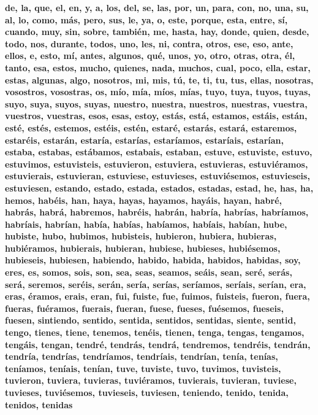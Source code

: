 \begin{displayquote}
\textbf{  de, la, que, el, en, y, a, los, del, se, las, por, un, para, con, no, una, su, al, lo, como, más, pero, sus, le, ya, o, este, porque, esta, entre, sí, cuando, muy, sin, sobre,
 también, me, hasta, hay, donde, quien, desde, todo, nos, durante, todos, uno, les, ni, contra, otros, ese, eso, ante, ellos, e, esto, mí, antes, algunos, qué, unos, yo, otro, otras, otra, él, tanto, esa, estos, mucho, quienes, nada, muchos, cual, poco, ella, estar, estas, algunas, algo, nosotros, mi, mis, tú, te, ti, tu, tus, ellas, nosotras, vosostros, vosostras, os, mío, mía, míos, mías, tuyo, tuya, tuyos, tuyas, suyo, suya, suyos, suyas, nuestro, nuestra, nuestros, nuestras, vuestra, vuestros, vuestras, esos, esas, estoy, estás, está, estamos, estáis, están, esté, estés, estemos, estéis, estén, estaré, estarás, estará, estaremos, estaréis, estarán, estaría, estarías, estaríamos, estaríais, estarían, estaba, estabas, 
 estábamos, estabais, estaban, estuve, estuviste, estuvo, estuvimos, estuvisteis, estuvieron, estuviera, estuvieras, estuviéramos, estuvierais, estuvieran, estuviese, estuvieses, 
 estuviésemos, estuvieseis, estuviesen, estando, estado, estada, estados, estadas, estad, he, has, ha, hemos, habéis, han, haya, hayas, hayamos, hayáis, hayan, habré, habrás, habrá, habremos, habréis, habrán, habría, habrías, habríamos, habríais, habrían, había, habías, habíamos, habíais, habían, 
 hube, hubiste, hubo, hubimos, hubisteis, hubieron, hubiera, hubieras, hubiéramos, hubierais, hubieran, hubiese,
 hubieses, hubiésemos, hubieseis, hubiesen, habiendo, habido, habida, habidos, habidas, soy, eres, es, somos, sois, son, sea, 
 seas, seamos, seáis, sean, seré, serás, será, seremos, 
 seréis, serán, sería, serías, seríamos, seríais, serían, era, 
 eras, éramos, erais, eran, fui, fuiste, fue, fuimos, 
 fuisteis, fueron, fuera, fueras, fuéramos, fuerais, fueran, fuese, fueses, fuésemos, fueseis, fuesen, sintiendo, sentido, sentida, sentidos, sentidas, siente, sentid, tengo, 
 tienes, tiene, tenemos, tenéis, tienen, tenga, tengas, tengamos, tengáis, tengan, tendré, tendrás, tendrá, tendremos, tendréis, tendrán, tendría, tendrías, tendríamos, tendríais, 
 tendrían, tenía, tenías, teníamos, teníais, tenían, tuve, tuviste, tuvo, tuvimos, tuvisteis, tuvieron, tuviera, tuvieras, tuviéramos, tuvierais, tuvieran, tuviese, tuvieses, tuviésemos, 
 tuvieseis, tuviesen, teniendo, tenido, tenida, tenidos, tenidas
}
\end{displayquote}





